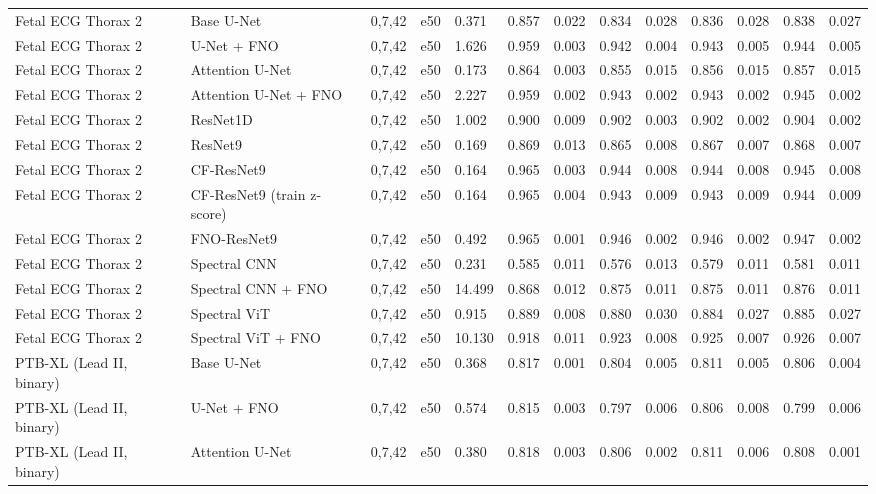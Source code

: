 \begin{longtable}{lllllllllllll}
Fetal ECG Thorax 2 & Base U-Net & 0,7,42 & e50 & 0.371 & 0.857 & 0.022 & 0.834 & 0.028 & 0.836 & 0.028 & 0.838 & 0.027 \\
Fetal ECG Thorax 2 & U-Net + FNO & 0,7,42 & e50 & 1.626 & 0.959 & 0.003 & 0.942 & 0.004 & 0.943 & 0.005 & 0.944 & 0.005 \\
Fetal ECG Thorax 2 & Attention U-Net & 0,7,42 & e50 & 0.173 & 0.864 & 0.003 & 0.855 & 0.015 & 0.856 & 0.015 & 0.857 & 0.015 \\
Fetal ECG Thorax 2 & Attention U-Net + FNO & 0,7,42 & e50 & 2.227 & 0.959 & 0.002 & 0.943 & 0.002 & 0.943 & 0.002 & 0.945 & 0.002 \\
Fetal ECG Thorax 2 & ResNet1D & 0,7,42 & e50 & 1.002 & 0.900 & 0.009 & 0.902 & 0.003 & 0.902 & 0.002 & 0.904 & 0.002 \\
Fetal ECG Thorax 2 & ResNet9 & 0,7,42 & e50 & 0.169 & 0.869 & 0.013 & 0.865 & 0.008 & 0.867 & 0.007 & 0.868 & 0.007 \\
Fetal ECG Thorax 2 & CF-ResNet9 & 0,7,42 & e50 & 0.164 & 0.965 & 0.003 & 0.944 & 0.008 & 0.944 & 0.008 & 0.945 & 0.008 \\
Fetal ECG Thorax 2 & CF-ResNet9 (train z-score) & 0,7,42 & e50 & 0.164 & 0.965 & 0.004 & 0.943 & 0.009 & 0.943 & 0.009 & 0.944 & 0.009 \\
Fetal ECG Thorax 2 & FNO-ResNet9 & 0,7,42 & e50 & 0.492 & 0.965 & 0.001 & 0.946 & 0.002 & 0.946 & 0.002 & 0.947 & 0.002 \\
Fetal ECG Thorax 2 & Spectral CNN & 0,7,42 & e50 & 0.231 & 0.585 & 0.011 & 0.576 & 0.013 & 0.579 & 0.011 & 0.581 & 0.011 \\
Fetal ECG Thorax 2 & Spectral CNN + FNO & 0,7,42 & e50 & 14.499 & 0.868 & 0.012 & 0.875 & 0.011 & 0.875 & 0.011 & 0.876 & 0.011 \\
Fetal ECG Thorax 2 & Spectral ViT & 0,7,42 & e50 & 0.915 & 0.889 & 0.008 & 0.880 & 0.030 & 0.884 & 0.027 & 0.885 & 0.027 \\
Fetal ECG Thorax 2 & Spectral ViT + FNO & 0,7,42 & e50 & 10.130 & 0.918 & 0.011 & 0.923 & 0.008 & 0.925 & 0.007 & 0.926 & 0.007 \\
PTB-XL (Lead II, binary) & Base U-Net & 0,7,42 & e50 & 0.368 & 0.817 & 0.001 & 0.804 & 0.005 & 0.811 & 0.005 & 0.806 & 0.004 \\
PTB-XL (Lead II, binary) & U-Net + FNO & 0,7,42 & e50 & 0.574 & 0.815 & 0.003 & 0.797 & 0.006 & 0.806 & 0.008 & 0.799 & 0.006 \\
PTB-XL (Lead II, binary) & Attention U-Net & 0,7,42 & e50 & 0.380 & 0.818 & 0.003 & 0.806 & 0.002 & 0.811 & 0.006 & 0.808 & 0.001 \\

\end{longtable}
